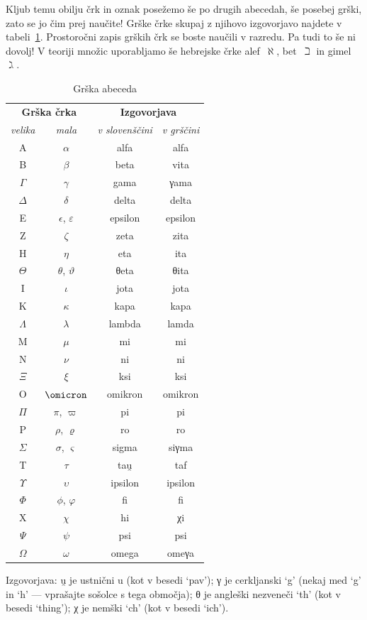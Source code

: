 Kljub temu obilju črk in oznak posežemo še po drugih abecedah, še posebej grški, zato se
jo čim prej naučite! Grške črke skupaj z njihovo izgovorjavo najdete v
tabeli~\ref{tabela:grska-abeceda}. Prostoročni zapis grških črk se boste naučili v
razredu.
%
Pa tudi to še ni dovolj! V teoriji množic uporabljamo še hebrejske črke
alef~$\aleph$, bet~$\beth$ in gimel~$\gimel$.

\begin{table}[htp]
\begin{center}
\begin{tabular}{cc|cc}
\multicolumn{2}{c|}{\textbf{Grška črka}} & \multicolumn{2}{c}{\textbf{Izgovorjava}} \\
\textit{velika} & \textit{mala} & \textit{v slovenščini} & \textit{v grščini} \\
\hline
A & $\alpha$ & alfa & alfa \\
B & $\beta$ & beta & vita \\
$\Gamma$ & $\gamma$ & gama & γama \\
$\Delta$ & $\delta$ & delta & delta \\
E & $\epsilon$, $\varepsilon$ & epsilon & epsilon \\
Z & $\zeta$ & zeta & zita \\
H & $\eta$ & eta & ita \\
$\Theta$ & $\theta$, $\vartheta$ & θeta & θita \\
I & $\iota$ & jota & jota \\
K & $\kappa$ & kapa & kapa \\
$\Lambda$ & $\lambda$ & lambda & lamda \\
M & $\mu$ & mi & mi \\
N & $\nu$ & ni & ni \\
$\Xi$ & $\xi$ & ksi & ksi \\
O & $\omicron$ & omikron & omikron \\
$\Pi$ & $\pi$, $\varpi$ & pi & pi \\
P & $\rho$, $\varrho$ & ro & ro \\
$\Sigma$ & $\sigma$, $\varsigma$ & sigma & siγma \\
T & $\tau$ & tau̯ & taf \\
$\Upsilon$ & $\upsilon$ & ipsilon & ipsilon \\
$\Phi$ & $\phi$, $\varphi$ & fi & fi \\
X & $\chi$ & hi & χi \\
$\Psi$ & $\psi$ & psi & psi \\
$\Omega$ & $\omega$ & omega & omeγa \\
\end{tabular}
\end{center}
\par\medskip
\footnotesize{
Izgovorjava: u̯ je ustnični u (kot v besedi `pav');
γ je cerkljanski `g' (nekaj med `g' in `h' --- vprašajte sošolce s tega območja);
θ je angleški nezveneči `th' (kot v besedi `thing');
χ je nemški `ch' (kot v besedi `ich').}
\caption{Grška abeceda}
\label{tabela:grska-abeceda}
\end{table}

